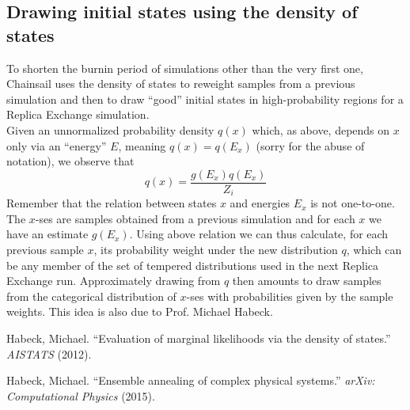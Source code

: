 \documentclass{article}
\begin{document}
\subsection*{Drawing initial states using the density of states}
To shorten the burnin period of simulations other than the very first one, Chainsail uses the density of states to reweight samples from a previous simulation and then to draw ``good'' initial states in high-probability regions for a Replica Exchange simulation.\\
Given an unnormalized probability density $q(x)$ which, as above, depends on $x$ only via an ``energy'' $E$, meaning $q(x) = q(E_x)$ (sorry for the abuse of notation), we observe that
\begin{equation*}
  q(x) = \frac{g(E_x)q(E_x)}{Z_i}
\end{equation*}
Remember that the relation between states $x$ and energies $E_x$ is not one-to-one. The $x$-ses are samples obtained from a previous simulation and for each $x$ we have an estimate $g(E_x)$. Using above relation we can thus calculate, for each previous sample $x$, its probability weight under the new distribution $q$, which can be any member of the set of tempered distributions used in the next Replica Exchange run. Approximately drawing from $q$ then amounts to draw samples from the categorical distribution of $x$-ses with probabilities given by the sample weights. This idea is also due to Prof. Michael Habeck\cite{habeck_ensemble_annealing}.
\begin{thebibliography}{9}
Habeck, Michael. “Evaluation of marginal likelihoods via the density of states.” \textit{AISTATS} (2012).

Habeck, Michael. “Ensemble annealing of complex physical systems.” \textit{arXiv: Computational Physics} (2015).
\end{thebibliography}
\end{document}
